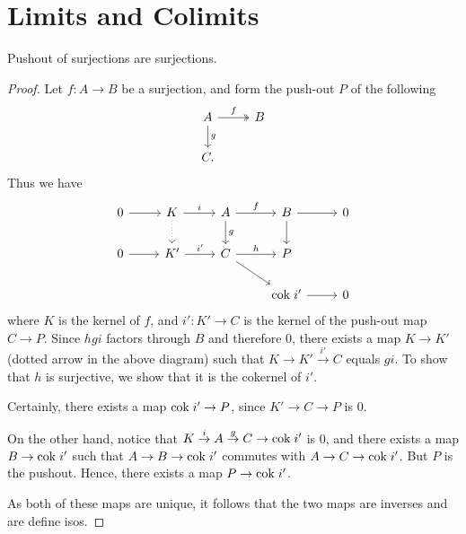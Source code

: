 \section{Limits and Colimits}
\begin{prop}
Pushout of surjections are surjections.
\end{prop}

\begin{proof}
Let $f: A \to B$ be a surjection, and form the push-out $P$ of the 
following
\[
\begin{tikzcd}
A \arrow[twoheadrightarrow]{r}{f} \arrow{d}{g} &
B \\
C.
\end{tikzcd}
\]
Thus we have
\[
\begin{tikzcd}
0 \arrow{r} & 
K \arrow{r}{i}\arrow[dotted]{d} &
A \arrow{r}{f}\arrow{d}{g} &
B \arrow{r}\arrow{d}&
0 \\
0 \arrow{r} &
K' \arrow{r}{i'} &
C \arrow{r}{h} \arrow{rd}&
P \\
& & &\cok i' \arrow{r} &
0
\end{tikzcd}
\]
where $K$ is the kernel of $f$, and $i': K' \to C$ is the kernel 
of the push-out map $C \to P$. Since $hgi$ factors through $B$
and therefore $0$, there exists a map $K \to K'$ (dotted arrow
in the above diagram) such that $K \to K' \stackrel{i'}{\to} C$
equals $gi$. To show that $h$ is surjective, we show that it is 
the cokernel of $i'$.

Certainly, there exists a map $\mathrm{cok}\; i' \to P$, since $K' \to C 
\to P$ is 0. 

On the other hand, notice that $K \stackrel{i}{\to} A 
\stackrel{g}{\to} C \to \mathrm{cok}\; i'$ is 0, and there exists a map
$B \to \mathrm{cok}\; i'$ such that $A \to B \to \mathrm{cok}\; i'$ commutes with
$A \to C \to \mathrm{cok}\; i'$. But $P$ is the pushout. Hence, there
exists a map $P \to \mathrm{cok}\; i'$. 

As both of these maps are unique, it follows that the two maps
are inverses and are define isos.
\end{proof}

